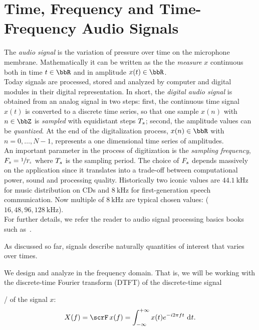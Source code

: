 \section{Time, Frequency and Time-Frequency Audio Signals}
The \textit{audio signal} is the variation of pressure over time on the microphone membrane.
Mathematically it can be written as the the \textit{measure}
$x$ continuous both in time $t \in \R$ and in amplitude $x(t) \in \R$.
\\Today signals are processed, stored and analyzed by computer and digital modules in their
digital representation.
In short, the \textit{digital audio signal} is obtained from an analog signal in two steps:
first, the continuous time signal $x(t)$ is converted to a discrete time series,
so that one sample $x(n)$ with $n \in \Z$ is \textit{sampled} with equidistant steps $T_s$;
second, the amplitude values can be \textit{quantized}.
At the end of the digitalization process, $x(n) \in \R$ with $n = 0, \dots, N-1$, represents a one dimensional time series of amplitudes.
\\An important parameter in the process of digitization is the \textit{sampling frequency},  $F_s = \sfrac{1}{T_s}$
where $T_s$ is the sampling period.
The choice of $F_s$ depends massively on the application since it translates into a trade-off between computational power, sound and processing quality.
Historically two iconic values are $\SI{44.1}{\kHz}$ for music distribution on CDs and $\SI{8}{\kHz}$ for first-generation speech communication.
Now multiple of $\SI{8}{\kHz}$ are typical chosen values: ($16, 48, 96, \SI{128}{\kHz}$).
\\For further details, we refer the reader to audio signal processing basics books such as~\cite{rocchesso2003introduction}.

As discussed so far, signals describe naturally quantities of interest that varies over times.

We design and analyze  in the frequency domain. That is, we will be
working with the discrete-time Fourier transform (DTFT) of the discrete-time signal

\FTdef/ of the signal $x$:
\begin{equation}
    X(f) = \fourierTrans{x}(f) =
        \int_{-\infty}^{+\infty}
        x(t)
        \cste^{-\csti 2 \pi f t}
        \,\kdiff{t}.
\end{equation}

